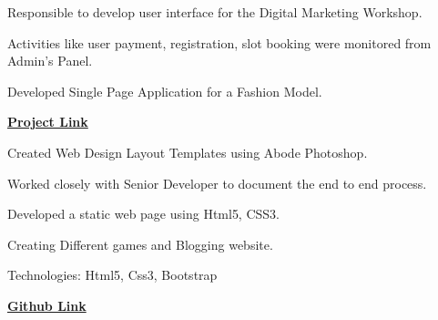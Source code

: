 \documentclass[]{deedy-resume-openfont}
\begin{document}
\begin{minipage}[t]{0.66\textwidth}
\begin{tightemize}
\item Responsible to develop user interface for the Digital Marketing Workshop.
\item Activities like user payment, registration, slot booking were monitored from Admin's Panel.
\item Developed Single Page Application for a Fashion Model.
\item \href{https://karshil2309.github.io/Website_Workshop/}{\bf Project Link}

\end{tightemize}
\sectionsep

\begin{tightemize}
\item Created Web Design Layout Templates using Abode Photoshop.
\item Worked closely with Senior Developer to document the end to end process.
\item Developed a static web page using Html5, CSS3.
\end{tightemize}
\sectionsep

\begin{tightemize}
\item Creating Different games and Blogging website.
\item Technologies: Html5, Css3, Bootstrap
\item \href{https://github.com/karshil2309/Practice_FrontEnd}{\bf Github Link}
\end{tightemize}
\sectionsep




\end{minipage}
\end{document}
